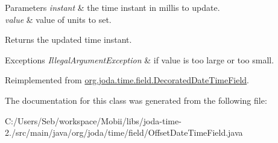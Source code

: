\begin{DoxyParams}{Parameters}
{\em instant} & the time instant in millis to update. \\
\hline
{\em value} & value of units to set. \\
\hline
\end{DoxyParams}
\begin{DoxyReturn}{Returns}
the updated time instant. 
\end{DoxyReturn}

\begin{DoxyExceptions}{Exceptions}
{\em Illegal\-Argument\-Exception} & if value is too large or too small. \\
\hline
\end{DoxyExceptions}


Reimplemented from \hyperlink{classorg_1_1joda_1_1time_1_1field_1_1_decorated_date_time_field_a2c48e6d5c609215a6b33049feb869f7a}{org.\-joda.\-time.\-field.\-Decorated\-Date\-Time\-Field}.



The documentation for this class was generated from the following file\-:\begin{DoxyCompactItemize}
\item 
C\-:/\-Users/\-Seb/workspace/\-Mobii/libs/joda-\/time-\/2./src/main/java/org/joda/time/field/Offset\-Date\-Time\-Field.\-java\end{DoxyCompactItemize}
